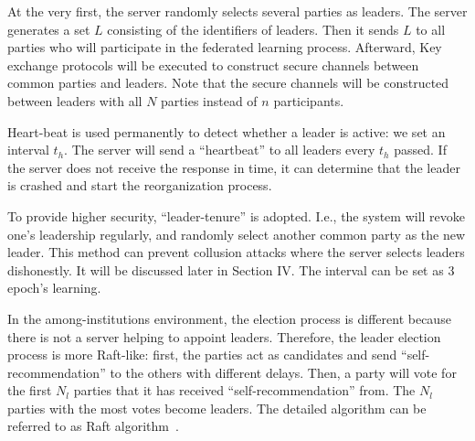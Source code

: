 At the very first, the server randomly selects several parties as leaders. The server generates a set $L$ consisting of the identifiers of leaders. Then it sends $L$ to all parties who will participate in the federated learning process. Afterward, Key exchange protocols will be executed to construct secure channels between common parties and leaders. Note that the secure channels will be constructed between leaders with all $N$ parties instead of $n$ participants.

Heart-beat is used permanently to detect whether a leader is active: we set an interval $t_h$. The server will send a ``heartbeat'' to all leaders every $t_h$ passed. If the server does not receive the response in time, it can determine that the leader is crashed and start the reorganization process.

To provide higher security, ``leader-tenure'' is adopted. I.e., the system will revoke one's leadership regularly, and randomly select another common party as the new leader. This method can prevent collusion attacks where the server selects leaders dishonestly. It will be discussed later in Section IV. The interval can be set as 3 epoch's learning.

In the among-institutions environment, the election process is different because there is not a server helping to appoint leaders. Therefore, the leader election process is more Raft-like: first, the parties act as candidates and send ``self-recommendation'' to the others with different delays. Then, a party will vote for the first $N_l$ parties that it has received ``self-recommendation'' from. The $N_l$ parties with the most votes become leaders. The detailed algorithm can be referred to as Raft algorithm~\cite{Raft}.

